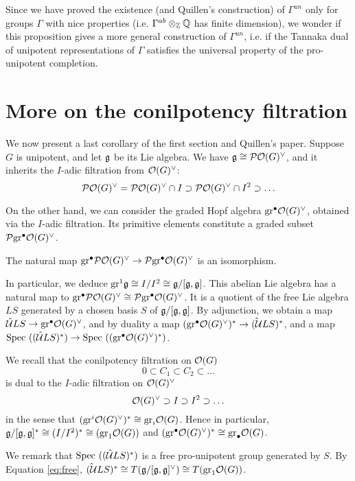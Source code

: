 Since we have proved the existence (and Quillen's construction) of $\Gamma^{un}$ only for groups $\Gamma$ with nice properties (i.e. $\Gamma^{ab}\otimes_{\mathbb{Z}}\mathbb{Q}$ has finite dimension), we wonder if this proposition gives a more general construction of $\Gamma^{un}$, i.e. if the Tannaka dual of unipotent representations of $\Gamma$ satisfies the universal property of the pro-unipotent completion.

\section{More on the conilpotency filtration}

We now present a last corollary of the first section and Quillen's paper. Suppose $G$ is unipotent, and let $\mathfrak{g}$ be its Lie algebra. We have $\mathfrak{g}\cong\mathcal{P}\mathcal{O}(G)^\vee$, and it inherits the $I$-adic filtration from $\mathcal{O}(G)^\vee$:
\[\mathcal{P}\mathcal{O}(G)^\vee=\mathcal{P}\mathcal{O}(G)^\vee\cap I\supset \mathcal{P}\mathcal{O}(G)^\vee\cap I^2\supset\ldots\]

On the other hand, we can consider the graded Hopf algebra $\mathrm{gr}^\bullet\mathcal{O}(G)^\vee$, obtained via the $I$-adic filtration. Its primitive elements constitute a graded subset $\mathcal{P}\mathrm{gr}^\bullet\mathcal{O}(G)^\vee$.

\begin{prop}\cite[Proposition A.2.14]{quillen-r}
The natural map $\mathrm{gr}^\bullet\mathcal{P}\mathcal{O}(G)^\vee\to\mathcal{P}\mathrm{gr}^\bullet\mathcal{O}(G)^\vee$ is an isomorphism.
\end{prop}

In particular, we deduce $\mathrm{gr}^1\mathfrak{g}\cong I/I^2\cong\mathfrak{g}/[\mathfrak{g},\mathfrak{g}]$. This abelian Lie algebra has a natural map to $\mathrm{gr}^\bullet\mathcal{P}\mathcal{O}(G)^\vee\cong\mathcal{P}\mathrm{gr}^\bullet\mathcal{O}(G)^\vee$. It is a quotient of the free Lie algebra $LS$ generated by a chosen basis $S$ of $\mathfrak{g}/[\mathfrak{g},\mathfrak{g}]$. By adjunction, we obtain a map $\hat{\mathcal{U}}LS\to\mathrm{gr}^\bullet\mathcal{O}(G)^\vee$, and by duality a map $(\mathrm{gr}^\bullet\mathcal{O}(G)^\vee)^*\to\hat{(\mathcal{U}}LS)^*$, and a map $\mathrm{Spec}~((\hat{\mathcal{U}}LS)^*)\to\mathrm{Spec}~((\mathrm{gr}^\bullet\mathcal{O}(G)^\vee)^*)$.

We recall that the conilpotency filtration on $\mathcal{O}(G)$
\[
0\subset C_1\subset C_2\subset\ldots
\]
is dual to the $I$-adic filtration on $\mathcal{O}(G)^\vee$
\[
\mathcal{O}(G)^\vee\supset I\supset I^2\supset\ldots
\]
in the sense that $(\mathrm{gr}^i\mathcal{O}(G)^\vee)^*\cong\mathrm{gr}_i\mathcal{O}(G)$. Hence in particular, $\mathfrak{g}/[\mathfrak{g},\mathfrak{g}]^*\cong(I/I^2)^*\cong(\mathrm{gr}_1\mathcal{O}(G))$ and $(\mathrm{gr}^\bullet\mathcal{O}(G)^\vee)^*\cong\mathrm{gr}_\bullet\mathcal{O}(G)$.

We remark that $\mathrm{Spec}~((\hat{\mathcal{U}}LS)^*)$ is a free pro-unipotent group generated by $S$. By Equation \ref{eq:free}, $\hat{(\mathcal{U}}LS)^*\cong T(\mathfrak{g}/[\mathfrak{g},\mathfrak{g}]^\vee)\cong T(\mathrm{gr}_1\mathcal{O}(G))$.

